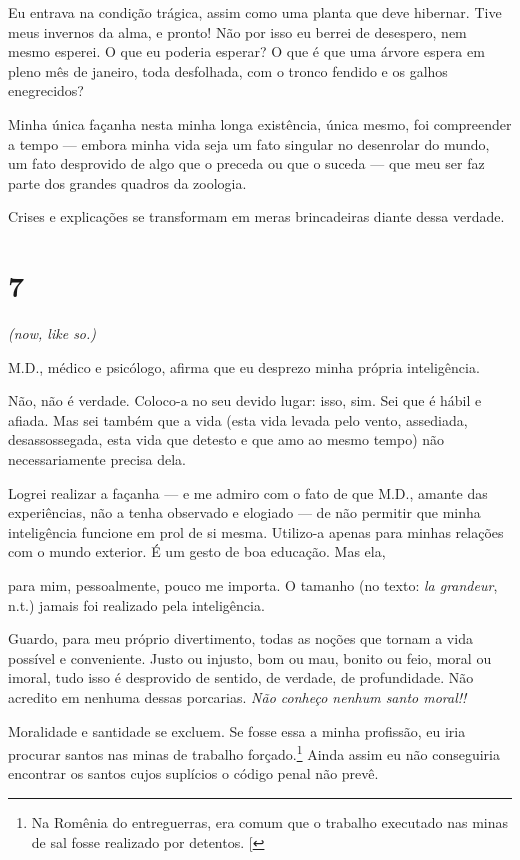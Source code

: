 Eu entrava na condição trágica, assim como uma planta que deve hibernar.
Tive meus invernos da alma, e pronto! Não por isso eu berrei de
desespero, nem mesmo esperei. O que eu poderia esperar? O que é que uma
árvore espera em pleno mês de janeiro, toda desfolhada, com o tronco
fendido e os galhos enegrecidos?

Minha única façanha nesta minha longa existência, única mesmo, foi
compreender a tempo --- embora minha vida seja um fato singular no
desenrolar do mundo, um fato desprovido de algo que o preceda ou que o
suceda --- que meu ser faz parte dos grandes quadros da zoologia.

Crises e explicações se transformam em meras brincadeiras diante dessa
verdade.

\section{7}

\emph{(now, like so.)}

M.D., médico e psicólogo, afirma que eu desprezo minha própria
inteligência.

Não, não é verdade. Coloco-a no seu devido lugar: isso, sim. Sei que é
hábil e afiada. Mas sei também que a vida (esta vida levada pelo vento,
assediada, desassossegada, esta vida que detesto e que amo ao mesmo
tempo) não necessariamente precisa dela.

Logrei realizar a façanha --- e me admiro com o fato de que M.D., amante
das experiências, não a tenha observado e elogiado --- de não permitir que
minha inteligência funcione em prol de si mesma. Utilizo-a apenas para
minhas relações com o mundo exterior. É um gesto de boa educação. Mas
ela,

para mim, pessoalmente, pouco me importa. O tamanho (no texto: \emph{la
grandeur}, n.t.) jamais foi realizado pela inteligência.

Guardo, para meu próprio divertimento, todas as noções que tornam a vida
possível e conveniente. Justo ou injusto, bom ou mau, bonito ou feio,
moral ou imoral, tudo isso é desprovido de sentido, de verdade, de
profundidade. Não acredito em nenhuma dessas porcarias. \emph{Não
conheço nenhum santo moral!!}

Moralidade e santidade se excluem. Se fosse essa a minha profissão, eu
iria procurar santos nas minas de trabalho
forçado.\footnote{Na Romênia do entreguerras, era comum que o trabalho executado nas minas de sal fosse realizado por detentos. {[}\versal{N.~T.}{]}} Ainda
assim eu não conseguiria encontrar os santos cujos suplícios o código
penal não prevê.

